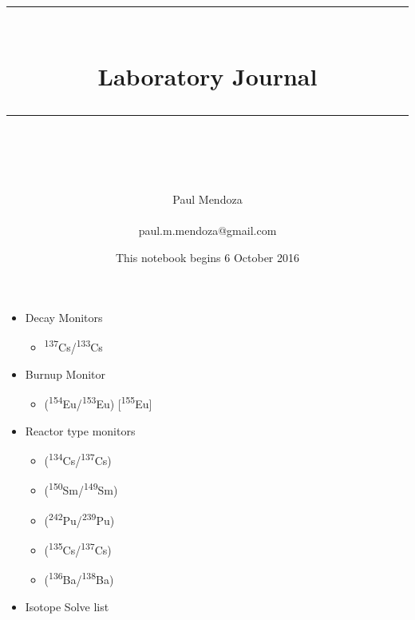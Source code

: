 \documentclass[idxtotoc,hyperref,openany,oneside]{labbook} %
\newcommand{\HRule}{\rule{\linewidth}{0.5mm}} %
\newcommand{\tss}{\textsuperscript}
\begin{document}

\frontmatter %
\title{
\begin{center}
\HRule \\[0.4cm]
{\Huge \bfseries Laboratory Journal }\\[0.4cm] %
\HRule \\[1.5cm]
\end{center}
}
\author{\Huge Paul Mendoza \\ \\ \LARGE paul.m.mendoza@gmail.com \\[2cm]}
\date{This notebook begins 6 October 2016} 
\maketitle

\tableofcontents

\mainmatter 







\begin{itemize}
\item{Decay Monitors}
  \begin{itemize}
  \item{\tss{137}Cs/\tss{133}Cs}
  \end{itemize}
\item{Burnup Monitor}
  \begin{itemize}
  \item{(\tss{154}Eu/\tss{153}Eu) [\tss{155}Eu]}
  \end{itemize}
\item{Reactor type monitors}
  \begin{itemize}
  \item{(\tss{134}Cs/\tss{137}Cs)}
  \item{(\tss{150}Sm/\tss{149}Sm)}
  \item{(\tss{242}Pu/\tss{239}Pu)}
  \item{(\tss{135}Cs/\tss{137}Cs)}
  \item{(\tss{136}Ba/\tss{138}Ba)}
  \end{itemize}
\item{Isotope Solve list}
\end{itemize}
\end{document}
